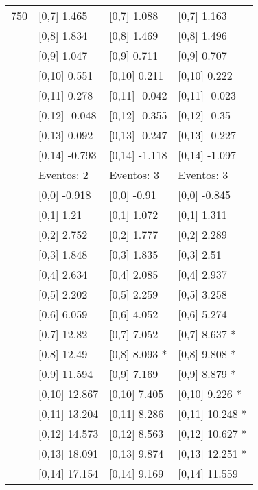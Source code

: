 \begin{table}
\begin{tabular}[t]{llll}
750 & {}[0,7] 1.465 & {}[0,7] 1.088 & {}[0,7] 1.163\\
\addlinespace
 & {}[0,8] 1.834 & {}[0,8] 1.469 & {}[0,8] 1.496\\
 & {}[0,9] 1.047 & {}[0,9] 0.711 & {}[0,9] 0.707\\
 & {}[0,10] 0.551 & {}[0,10] 0.211 & {}[0,10] 0.222\\
 & {}[0,11] 0.278 & {}[0,11] -0.042 & {}[0,11] -0.023\\
 & {}[0,12] -0.048 & {}[0,12] -0.355 & {}[0,12] -0.35\\
\addlinespace
 & {}[0,13] 0.092 & {}[0,13] -0.247 & {}[0,13] -0.227\\
 & {}[0,14] -0.793 & {}[0,14] -1.118 & {}[0,14] -1.097\\
 & Eventos:  2 & Eventos:  3 & Eventos:  3\\
 & {}[0,0] -0.918 & {}[0,0] -0.91 & {}[0,0] -0.845\\
 & {}[0,1] 1.21 & {}[0,1] 1.072 & {}[0,1] 1.311\\
\addlinespace
 & {}[0,2] 2.752 & {}[0,2] 1.777 & {}[0,2] 2.289\\
 & {}[0,3] 1.848 & {}[0,3] 1.835 & {}[0,3] 2.51\\
 & {}[0,4] 2.634 & {}[0,4] 2.085 & {}[0,4] 2.937\\
 & {}[0,5] 2.202 & {}[0,5] 2.259 & {}[0,5] 3.258\\
 & {}[0,6] 6.059 & {}[0,6] 4.052 & {}[0,6] 5.274\\
\addlinespace
1000 & {}[0,7] 12.82 & {}[0,7] 7.052 & {}[0,7] 8.637 *\\
 & {}[0,8] 12.49 & {}[0,8] 8.093 * & {}[0,8] 9.808 *\\
 & {}[0,9] 11.594 & {}[0,9] 7.169 & {}[0,9] 8.879 *\\
 & {}[0,10] 12.867 & {}[0,10] 7.405 & {}[0,10] 9.226 *\\
 & {}[0,11] 13.204 & {}[0,11] 8.286 & {}[0,11] 10.248 *\\
\addlinespace
 & {}[0,12] 14.573 & {}[0,12] 8.563 & {}[0,12] 10.627 *\\
 & {}[0,13] 18.091 & {}[0,13] 9.874 & {}[0,13] 12.251 *\\
 & {}[0,14] 17.154 & {}[0,14] 9.169 & {}[0,14] 11.559\\
\bottomrule
\end{tabular}
\end{table}

